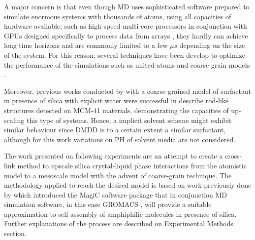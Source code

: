 \documentclass[10pt,a4paper,twoside]{article}
\begin{document}
A major concern is that even though MD uses sophisticated software prepared to simulate enormous systems with thousands of atoms, using all capacities of hardware available, such as high-speed multi-core processors in conjunction with GPUs designed specifically to process data from arrays \cite{gromacs}, they hardly can achieve long time horizons and are commonly limited to a few $\mu s$ depending on the size of the system. For this reason, several techniques have been develop to optimize the performance of the simulations such as united-atoms and coarse-grain models \cite{someone}. 

Moreover, previous works conducted by \cite{mjsilica} with a coarse-grained model of surfactant in presence of silica with explicit water were successful in describe rod-like structures detected on MCM-41 materials, demonstrating the capacities of up-scaling this type of systems. Hence, a implicit solvent scheme might exhibit similar behaviour since DMDD is to a certain extent a similar surfactant, although for this work variations on PH of solvent media are not considered.

The work presented on following experiments are an attempt to create a cross-link method to upscale silica crystal-liquid phase interactions \cite{silica1} from the atomistic model to a mesoscale model with the advent of coarse-grain technique. The methodology applied to reach the desired model is based on work previously done by  which introduced the MagiC software package \cite{magic} that in conjunction MD simulation software, in this case GROMACS \cite{gromacs}, will provide a suitable approximation to self-assembly of amphiphilic molecules in presence of silica. Further explanations of the process are described on Experimental Methods section. 
\end{document}
